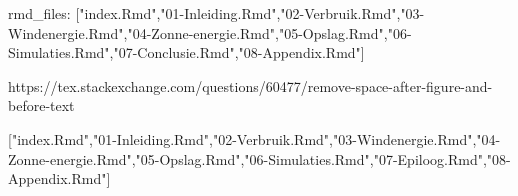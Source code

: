 \usepackage{float}

\let\origfigure\figure
\let\endorigfigure\endfigure
\renewenvironment{figure}[1][2] {
	\expandafter\origfigure\expandafter[!H]
} {
	\endorigfigure
}

rmd_files: ["index.Rmd","01-Inleiding.Rmd","02-Verbruik.Rmd","03-Windenergie.Rmd","04-Zonne-energie.Rmd","05-Opslag.Rmd","06-Simulaties.Rmd","07-Conclusie.Rmd","08-Appendix.Rmd"]

https://tex.stackexchange.com/questions/60477/remove-space-after-figure-and-before-text


["index.Rmd","01-Inleiding.Rmd","02-Verbruik.Rmd","03-Windenergie.Rmd","04-Zonne-energie.Rmd","05-Opslag.Rmd","06-Simulaties.Rmd","07-Epiloog.Rmd","08-Appendix.Rmd"]